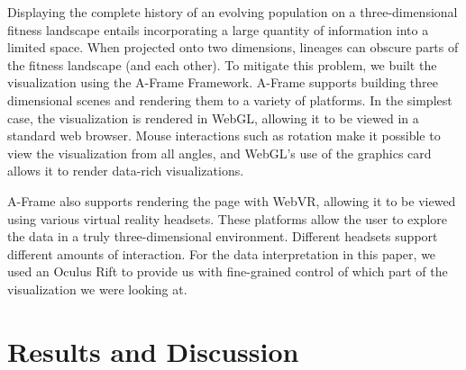 \documentclass[letterpaper]{article}
\begin{document}


Displaying the complete history of an evolving population on a three-dimensional fitness landscape entails incorporating a large quantity of information into a limited space. When projected onto two dimensions, lineages can obscure parts of the fitness landscape (and each other). To mitigate this problem, we built the visualization using the A-Frame Framework. A-Frame supports building three dimensional scenes and rendering them to a variety of platforms. In the simplest case, the visualization is rendered in WebGL, allowing it to be viewed in a standard web browser. Mouse interactions such as rotation make it possible to view the visualization from all angles, and WebGL's use of the graphics card allows it to render data-rich visualizations. 

A-Frame also supports rendering the page with WebVR, allowing it to be viewed using various virtual reality headsets. These platforms allow the user to explore the data in a truly three-dimensional environment. Different headsets support different amounts of interaction. For the data interpretation in this paper, we used an Oculus Rift to provide us with fine-grained control of which part of the visualization we were looking at.


\section{Results and Discussion}
\end{document}

